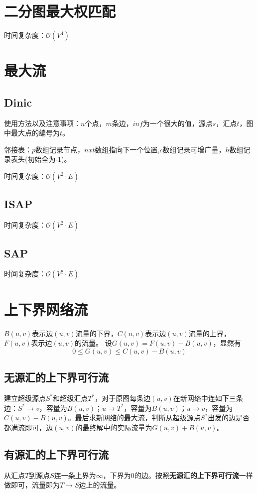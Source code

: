 \documentclass[openany, a4paper, 10pt]{book}
\begin{document}
\begin{spacing}{1.0}
		\section{二分图最大权匹配}
			时间复杂度：$\mathcal{O}(V^4)$
			
		\section{最大流}
			\subsection{Dinic}
				使用方法以及注意事项：$n$个点，$m$条边，$inf$为一个很大的值，源点$s$，汇点$t$，图中最大点的编号为$t$。\par
				\indent 邻接表：$p$数组记录节点，$nxt$数组指向下一个位置,$c$数组记录可增广量，$h$数组记录表头(初始全为-1)。\par
				\indent 时间复杂度：$\mathcal{O}(V^2 \cdot E)$
				
			\subsection{ISAP}
				\indent 时间复杂度：$\mathcal{O}(V^2 \cdot E)$
				
			\subsection{SAP}
				\indent 时间复杂度：$\mathcal{O}(V^2 \cdot E)$
				
		\section{上下界网络流}
			$B(u,v)$表示边$(u,v)$流量的下界，$C(u,v)$表示边$(u,v)$流量的上界，$F(u,v)$表示边$(u,v)$的流量。
			设$G(u,v) = F(u,v) - B(u,v)$，显然有
			$$0 \leq G(u,v) \leq C(u,v)-B(u,v)$$
		\subsection{无源汇的上下界可行流}
			建立超级源点$S^*$和超级汇点$T^*$，对于原图每条边$(u,v)$在新网络中连如下三条边：$S^* \rightarrow v$，容量为$B(u,v)$；$u \rightarrow T^*$，容量为$B(u,v)$；$u \rightarrow v$，容量为$C(u,v) - B(u,v)$。最后求新网络的最大流，判断从超级源点$S^*$出发的边是否都满流即可，边$(u,v)$的最终解中的实际流量为$G(u,v)+B(u,v)$。
		\subsection{有源汇的上下界可行流}
			从汇点$T$到源点$S$连一条上界为$\infty$，下界为$0$的边。按照\textbf{无源汇的上下界可行流}一样做即可，流量即为$T \rightarrow S$边上的流量。

\end{spacing}
\end{document}
